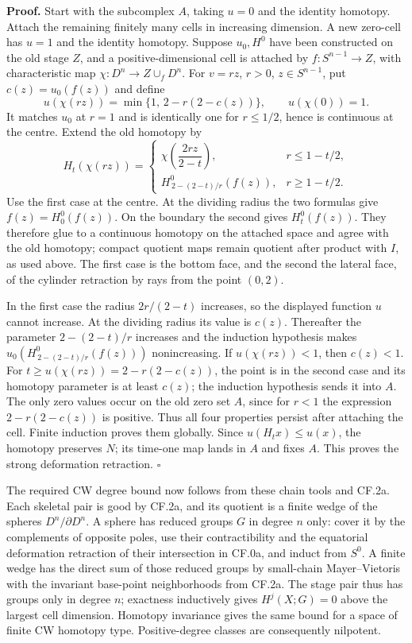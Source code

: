 \documentclass[
  11pt,
]{article}
\begin{document}
\textbf{Proof.} Start with the subcomplex \(A\), taking \(u=0\) and the
identity homotopy. Attach the remaining finitely many cells in
increasing dimension. A new zero-cell has \(u=1\) and the identity
homotopy. Suppose \(u_0,H^0\) have been constructed on the old stage
\(Z\), and a positive-dimensional cell is attached by
\(f:S^{n-1}\to Z\), with characteristic map \(\chi:D^n\to Z\cup_fD^n\).
For \(v=rz\), \(r>0\), \(z\in S^{n-1}\), put \(c(z)=u_0(f(z))\) and
define \[
u(\chi(rz))=\min\{1,\,2-r(2-c(z))\},\qquad u(\chi(0))=1.
\] It matches \(u_0\) at \(r=1\) and is identically one for
\(r\leq1/2\), hence is continuous at the centre. Extend the old homotopy
by \[
H_t(\chi(rz))=
\begin{cases}
\chi\!\left(\dfrac{2rz}{2-t}\right),& r\leq1-t/2,\\
H^0_{\,2-(2-t)/r}(f(z)),&r\geq1-t/2.
\end{cases}
\] Use the first case at the centre. At the dividing radius the two
formulas give \(f(z)=H^0_0(f(z))\). On the boundary the second gives
\(H^0_t(f(z))\). They therefore glue to a continuous homotopy on the
attached space and agree with the old homotopy; compact quotient maps
remain quotient after product with \(I\), as used above. The first case
is the bottom face, and the second the lateral face, of the cylinder
retraction by rays from the point \((0,2)\).

In the first case the radius \(2r/(2-t)\) increases, so the displayed
function \(u\) cannot increase. At the dividing radius its value is
\(c(z)\). Thereafter the parameter \(2-(2-t)/r\) increases and the
induction hypothesis makes \(u_0(H^0_{\,2-(2-t)/r}(f(z)))\)
nonincreasing. If \(u(\chi(rz))<1\), then \(c(z)<1\). For
\(t\geq u(\chi(rz))=2-r(2-c(z))\), the point is in the second case and
its homotopy parameter is at least \(c(z)\); the induction hypothesis
sends it into \(A\). The only zero values occur on the old zero set
\(A\), since for \(r<1\) the expression \(2-r(2-c(z))\) is positive.
Thus all four properties persist after attaching the cell. Finite
induction proves them globally. Since \(u(H_t x)\leq u(x)\), the
homotopy preserves \(N\); its time-one map lands in \(A\) and fixes
\(A\). This proves the strong deformation retraction. \(\square\)

The required CW degree bound now follows from these chain tools and
CF.2a. Each skeletal pair is good by CF.2a, and its quotient is a finite
wedge of the spheres \(D^n/\partial D^n\). A sphere has reduced groups
\(G\) in degree \(n\) only: cover it by the complements of opposite
poles, use their contractibility and the equatorial deformation
retraction of their intersection in CF.0a, and induct from \(S^0\). A
finite wedge has the direct sum of those reduced groups by small-chain
Mayer--Vietoris with the invariant base-point neighborhoods from CF.2a.
The stage pair thus has groups only in degree \(n\); exactness
inductively gives \(H^j(X;G)=0\) above the largest cell dimension.
Homotopy invariance gives the same bound for a space of finite CW
homotopy type. Positive-degree classes are consequently nilpotent.
\end{document}
